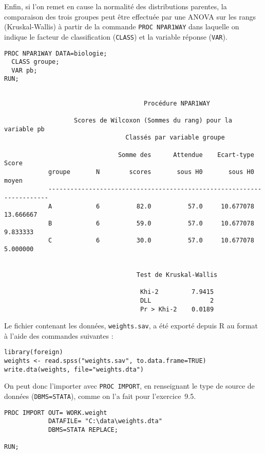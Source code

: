 Enfin, si l'on remet en cause la normalité des distributions parentes, la
comparaison des trois groupes peut être effectuée par une ANOVA sur les
rangs (Kruskal-Wallis) à partir de la commande \texttt{PROC NPAR1WAY} dans
laquelle on indique le facteur de classification (\texttt{CLASS}) et la
variable réponse (\texttt{VAR}).
\begin{verbatim}
PROC NPAR1WAY DATA=biologie; 
  CLASS groupe; 
  VAR pb; 
RUN;
\end{verbatim}

\begin{verbatim}

                                      Procédure NPAR1WAY

                   Scores de Wilcoxon (Sommes du rang) pour la variable pb
                                 Classés par variable groupe

                               Somme des      Attendue    Ecart-type         Score
            groupe       N        scores       sous H0       sous H0         moyen
            ----------------------------------------------------------------------
            A            6          82.0          57.0     10.677078     13.666667
            B            6          59.0          57.0     10.677078      9.833333
            C            6          30.0          57.0     10.677078      5.000000


                                    Test de Kruskal-Wallis

                                     Khi-2         7.9415
                                     DLL                2
                                     Pr > Khi-2    0.0189
\end{verbatim}
%
%
%
\soln{\ref{exo:9.7}}
Le fichier contenant les données, \texttt{weights.sav}, a été exporté depuis
R au format \Stata à l'aide des commandes suivantes :
\begin{verbatim}
library(foreign)
weights <- read.spss("weights.sav", to.data.frame=TRUE)
write.dta(weights, file="weights.dta")
\end{verbatim}
On peut donc l'importer avec \texttt{PROC IMPORT}, en renseignant le type de
source de données (\texttt{DBMS=STATA}), comme on l'a fait pour l'exercice~9.5.
\begin{verbatim}
PROC IMPORT OUT= WORK.weight
            DATAFILE= "C:\data\weights.dta"
            DBMS=STATA REPLACE;

RUN;
\end{verbatim}

